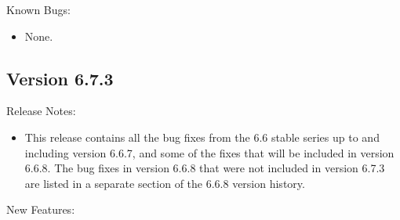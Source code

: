 \noindent Known Bugs:

\begin{itemize}

\item None.

\end{itemize}


\subsection{\label{sec:New-6-7-3}Version 6.7.3}

\noindent Release Notes:

\begin{itemize}

\item This release contains all the bug fixes from the 6.6 stable
  series up to and including version 6.6.7, and some of the fixes that
  will be included in version 6.6.8.
  The bug fixes in version 6.6.8 that were not included in version
  6.7.3 are listed in a separate section of the 6.6.8 version
  history. 

\end{itemize}


\noindent New Features:

